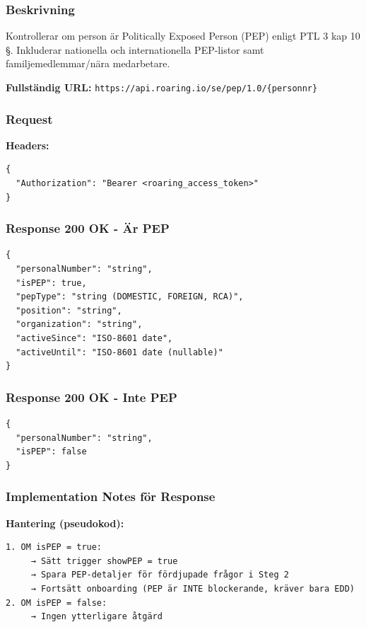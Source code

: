 \documentclass[12pt,a4paper]{article}
\begin{document}
\subsubsection{Beskrivning}

Kontrollerar om person är Politically Exposed Person (PEP) enligt PTL 3 kap 10 §. Inkluderar nationella och internationella PEP-listor samt familjemedlemmar/nära medarbetare.

\textbf{Fullständig URL:} \texttt{https://api.roaring.io/se/pep/1.0/\{personnr\}}

\subsubsection{Request}

\textbf{Headers:}
\begin{lstlisting}
{
  "Authorization": "Bearer <roaring_access_token>"
}
\end{lstlisting}

\subsubsection{Response 200 OK - Är PEP}

\begin{lstlisting}
{
  "personalNumber": "string",
  "isPEP": true,
  "pepType": "string (DOMESTIC, FOREIGN, RCA)",
  "position": "string",
  "organization": "string",
  "activeSince": "ISO-8601 date",
  "activeUntil": "ISO-8601 date (nullable)"
}
\end{lstlisting}

\subsubsection{Response 200 OK - Inte PEP}
\begin{lstlisting}
{
  "personalNumber": "string",
  "isPEP": false
}
\end{lstlisting}

\subsubsection{Implementation Notes för Response}

\textbf{Hantering (pseudokod):}
\begin{lstlisting}
1. OM isPEP = true:
     → Sätt trigger showPEP = true
     → Spara PEP-detaljer för fördjupade frågor i Steg 2
     → Fortsätt onboarding (PEP är INTE blockerande, kräver bara EDD)
2. OM isPEP = false:
     → Ingen ytterligare åtgärd
\end{lstlisting}
\end{document}
